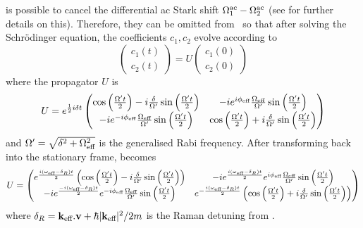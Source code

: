 is possible to cancel the differential ac Stark shift
$\Omega_1^\textnormal{ac} -\Omega_2^\textnormal{ac}$ (see
 for further details on this).
Therefore, they can be omitted from~ so that
after solving the Schr\"odinger equation, the coefficients $c_1,c_2$
evolve according to 
\begin{equation}
  \label{eq:schrodinger_prop}
  \begin{pmatrix} c_1(t) \\ c_2(t)\end{pmatrix} = U \begin{pmatrix}
c_1(0) \\ c_2(0)\end{pmatrix}
\end{equation}
where the propagator $U$ is
\begin{equation}
  U = e^{\frac{1}{2}i\delta t } \begin{pmatrix} 
  \cos \left(\frac{ \Omega' t}{2}\right)-i\frac{\delta}{\Omega'}\sin
  \left(\frac{\Omega' t}{2}\right) & 
 -i e^{i \phi_\textnormal{eff}} \frac{
 \Omega_\textnormal{eff}}{\Omega'} \sin \left(\frac{\Omega'
 t}{2}\right) \\ 
  -i e^{-i \phi_\textnormal{eff}} \frac{
  \Omega_\textnormal{eff}}{\Omega'} \sin \left(\frac{\Omega'
t}{2}\right)& \cos \left(\frac{ \Omega' t}{2}\right)+i\frac{
\delta  }{\Omega'}\sin \left(\frac{ \Omega' t}{2}\right) \\
\end{pmatrix}
\label{eq:propagator_first}
\end{equation}
and $\Omega' = \sqrt{\delta^2 + \Omega_\textnormal{eff}^2}$ is the
generalised Rabi frequency. After transforming back into the
stationary frame,  becomes
\begin{equation}
U =  \begin{pmatrix} 
  e^{\frac{i(\omega_\textnormal{eff}-\delta_R)t}{2}  }\left(\cos \left(\frac{ \Omega' t}{2}\right)-i\frac{\delta}{\Omega'}\sin
  \left(\frac{\Omega' t}{2}\right)\right) & 
 -i e^{\frac{i(\omega_\textnormal{eff}-\delta_R)t}{2}  }e^{i \phi_\textnormal{eff}} \frac{
 \Omega_\textnormal{eff}}{\Omega'} \sin \left(\frac{\Omega'
 t}{2}\right) \\ 
  -i e^{\frac{-i(\omega_\textnormal{eff}-\delta_R)t}{2}  }e^{-i \phi_\textnormal{eff}} \frac{
  \Omega_\textnormal{eff}}{\Omega'} \sin \left(\frac{\Omega'
  t}{2}\right)& e^{-\frac{i(\omega_\textnormal{eff}-\delta_R)t}{2}  }\left(\cos \left(\frac{ \Omega' t}{2}\right)+i\frac{
\delta  }{\Omega'}\sin \left(\frac{ \Omega' t}{2}\right)\right) \\
\end{pmatrix}
\label{eq:propagator_stationary}
\end{equation}  
where $\delta_R = {\textbf k_\textnormal{eff}}.\textbf{v} + \hbar |{\textbf k_\textnormal{eff}}|^2/2m$ is the Raman
detuning from
.
